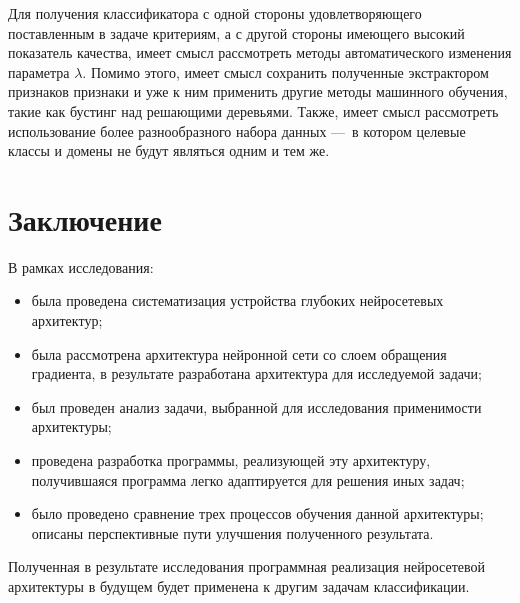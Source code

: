 \documentclass[14pt, a4paper]{extarticle}
\begin{document}
Для получения классификатора с одной стороны удовлетворяющего поставленным в задаче критериям, а с другой стороны имеющего высокий показатель качества, имеет смысл рассмотреть методы автоматического изменения параметра $\lambda$. Помимо этого, имеет смысл сохранить полученные экстрактором признаков признаки и уже к ним применить другие методы машинного обучения, такие как бустинг над решающими деревьями. Также, имеет смысл рассмотреть использование более разнообразного набора данных — в котором целевые классы и домены не будут являться одним и тем же.


\newpage
\section*{Заключение}

В рамках исследования:
\begin{itemize}
	\item была проведена систематизация устройства глубоких нейросетевых архитектур;
	\item была рассмотрена архитектура нейронной сети со слоем обращения градиента, в результате разработана архитектура для исследуемой задачи;
	\item был проведен анализ задачи, выбранной для исследования применимости архитектуры;
	\item проведена разработка программы, реализующей эту архитектуру, получившаяся программа легко адаптируется для решения иных задач;
	\item было проведено сравнение трех процессов обучения данной архитектуры; описаны перспективные пути улучшения полученного результата.
\end{itemize}

Полученная в результате исследования программная реализация нейросетевой архитектуры в будущем будет применена к другим задачам классификации.

\newpage
{}
\end{document}
